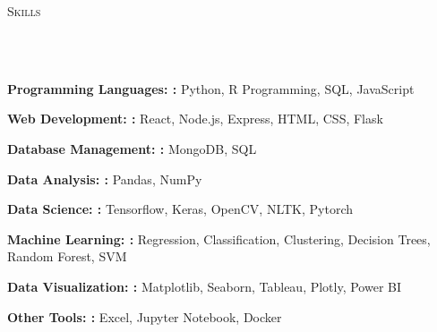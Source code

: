\documentclass{article}
\newcommand{\lineunder}{
        \vspace*{-8pt} \\ \hspace*{-18pt} 
        \hrulefill \\
        }
\newcommand{\header}[1]{{
        \hspace*{-15pt}\vspace*{6pt} \textsc{#1}} \vspace*{-6pt} 
        \lineunder
        }
\renewcommand{\labelitemii}{
        $\vcenter{\hbox{\tiny$\bullet$}}$\hspace*{-3pt}
        }
\newenvironment{bullet-list-major}{
          \begin{list}{\labelitemii}{\setlength\leftmargin{3pt} 
          \topsep 0pt \itemsep -2pt}}{\vspace*{4pt}\end{list}
          }
\begin{document}
      \header{Skills}
      {
        \begin{bullet-list-major}
        \item \textbf{Programming Languages: :} Python, R Programming, SQL, JavaScript
        \end{bullet-list-major}
        

        \begin{bullet-list-major}
        \item \textbf{Web Development: :} React, Node.js, Express, HTML, CSS, Flask
        \end{bullet-list-major}
        

        \begin{bullet-list-major}
        \item \textbf{Database Management: :} MongoDB, SQL
        \end{bullet-list-major}
        

        \begin{bullet-list-major}
        \item \textbf{Data Analysis: :} Pandas, NumPy
        \end{bullet-list-major}
        

        \begin{bullet-list-major}
        \item \textbf{Data Science: :} Tensorflow, Keras, OpenCV, NLTK, Pytorch
        \end{bullet-list-major}
        

        \begin{bullet-list-major}
        \item \textbf{Machine Learning: :} Regression, Classification, Clustering, Decision Trees, Random Forest, SVM
        \end{bullet-list-major}
        

        \begin{bullet-list-major}
        \item \textbf{Data Visualization: :} Matplotlib, Seaborn, Tableau, Plotly, Power BI
        \end{bullet-list-major}
        

        \begin{bullet-list-major}
        \item \textbf{Other Tools: :} Excel, Jupyter Notebook, Docker
        \end{bullet-list-major}
        }
  
\end{document}
